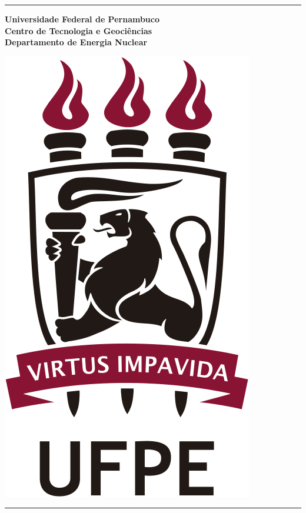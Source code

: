 \begin{titlepage}
\small{}
\singlespacing{}
\setlength\parindent{0pt}

\hrule
\bigskip
\begin{minipage}{0.65\textwidth}
	\begin{flushleft}
		\textbf{Universidade Federal de Pernambuco }\\
		\textbf{Centro de Tecnologia e Geociências}\\
		\textbf{Departamento de Energia Nuclear}
	\end{flushleft}
\end{minipage}
\bigskip
\begin{minipage}{0.35\textwidth}
	\begin{flushright}
		\includegraphics[draft=false, scale=0.33]{../img/logo-ufpe.jpg}
		\space \space \space \space
	\end{flushright}
\end{minipage}
\hrule


\end{titlepage}
